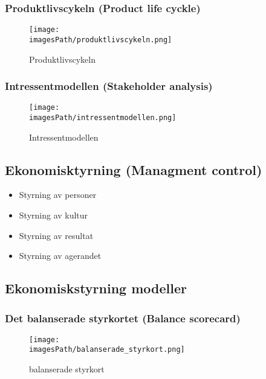 \newpage
\subsubsection{Produktlivscykeln (Product life cyckle)}
\begin{figure}[!h]
    \centering
    \texttt{[image: \\imagesPath/produktlivscykeln.png]}
    \caption{Produktlivscykeln}
\end{figure}

\subsubsection{Intressentmodellen (Stakeholder analysis)}
\begin{figure}[!h]
    \centering
    \texttt{[image: \\imagesPath/intressentmodellen.png]}
    \caption{Intressentmodellen}
\end{figure}


\subsection{Ekonomisktyrning (Managment control)}
\begin{itemize}
    \item Styrning av personer
    \item Styrning av kultur
    \item Styrning av resultat
    \item Styrning av agerandet
\end{itemize}

\subsection{Ekonomiskstyrning modeller}
\subsubsection{Det balanserade styrkortet (Balance scorecard)}
\begin{figure}[!h]
    \centering
    \texttt{[image: \\imagesPath/balanserade\_styrkort.png]}
    \caption{balanserade styrkort}
\end{figure}

